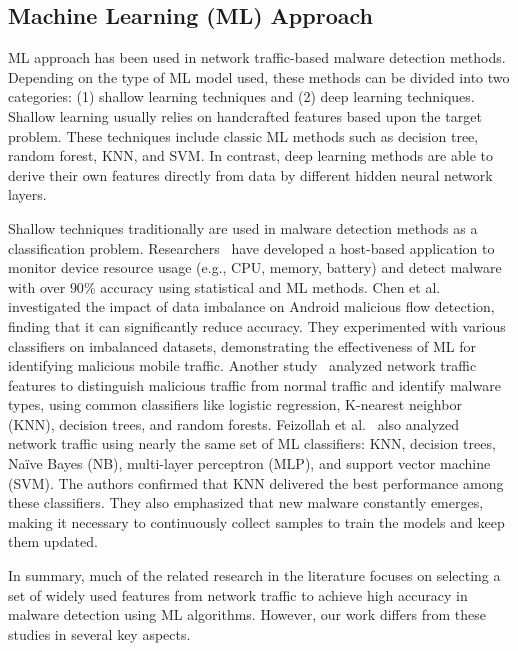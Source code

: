 \subsection{Machine Learning (ML) Approach}

ML approach has been used in network traffic-based malware detection methods. Depending on the type of ML model used, these methods can be divided into two categories: (1) shallow learning techniques and (2) deep learning techniques. Shallow learning usually relies on handcrafted features based upon the target problem. These techniques include classic ML methods such as decision tree, random forest, KNN, and SVM. In contrast, deep learning methods are able to derive their own features directly from data by different hidden neural network layers.

Shallow techniques traditionally are used in malware detection methods as a classification problem. Researchers~\cite{RIBEIRO2020} have developed a host-based application to monitor device resource usage (e.g., CPU, memory, battery) and detect malware with over $90$\% accuracy using statistical and ML methods. Chen et al.~\cite{CHEN2018346} investigated the impact of data imbalance on Android malicious flow detection, finding that it can significantly reduce accuracy. They experimented with various classifiers on imbalanced datasets, demonstrating the effectiveness of ML for identifying malicious mobile traffic. Another study~\cite{lashkari:pst-2017} analyzed network traffic features to distinguish malicious traffic from normal traffic and identify malware types, using common classifiers like logistic regression, K-nearest neighbor (KNN), decision trees, and random forests. Feizollah et al.~\cite{feizollah2013study} also analyzed network traffic using nearly the same set of ML classifiers: KNN, decision trees, Naïve Bayes (NB), multi-layer perceptron (MLP), and support vector machine (SVM). The authors confirmed that KNN delivered the best performance among these classifiers. They also emphasized that new malware constantly emerges, making it necessary to continuously collect samples to train the models and keep them updated.

In summary, much of the related research in the literature focuses on selecting a set of widely used features from network traffic to achieve high accuracy in malware detection using ML algorithms. However, our work differs from these studies in several key aspects.

